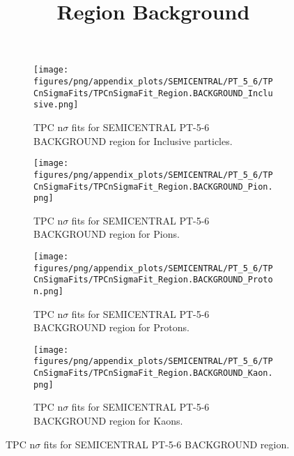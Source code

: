             \begin{figure}[H]
                \title{Region Background}
                \begin{subfigure}[b]{0.5\textwidth}
                    \centering
                    \texttt{[image: figures/png/appendix\_plots/SEMICENTRAL/PT\_5\_6/TPCnSigmaFits/TPCnSigmaFit\_Region.BACKGROUND\_Inclusive.png]}
                    \caption{TPC n$\sigma$ fits for SEMICENTRAL PT-5-6 BACKGROUND region for Inclusive particles.}
                    \label{fig:appendix_SEMICENTRAL_PT-5-6_BACKGROUND_Inclusive}
                \end{subfigure}
                \begin{subfigure}[b]{0.5\textwidth}
                    \centering
                    \texttt{[image: figures/png/appendix\_plots/SEMICENTRAL/PT\_5\_6/TPCnSigmaFits/TPCnSigmaFit\_Region.BACKGROUND\_Pion.png]}
                    \caption{TPC n$\sigma$ fits for SEMICENTRAL PT-5-6 BACKGROUND region for Pions.}
                    \label{fig:appendix_SEMICENTRAL_PT-5-6_BACKGROUND_Pion}
                \end{subfigure}
                \begin{subfigure}[b]{0.5\textwidth}
                    \centering
                    \texttt{[image: figures/png/appendix\_plots/SEMICENTRAL/PT\_5\_6/TPCnSigmaFits/TPCnSigmaFit\_Region.BACKGROUND\_Proton.png]}
                    \caption{TPC n$\sigma$ fits for SEMICENTRAL PT-5-6 BACKGROUND region for Protons.}
                    \label{fig:appendix_SEMICENTRAL_PT-5-6_BACKGROUND_Proton}
                \end{subfigure}
                \begin{subfigure}[b]{0.5\textwidth}
                    \centering
                    \texttt{[image: figures/png/appendix\_plots/SEMICENTRAL/PT\_5\_6/TPCnSigmaFits/TPCnSigmaFit\_Region.BACKGROUND\_Kaon.png]}
                    \caption{TPC n$\sigma$ fits for SEMICENTRAL PT-5-6 BACKGROUND region for Kaons.}
                    \label{fig:appendix_SEMICENTRAL_PT-5-6_BACKGROUND_Kaon}
                \end{subfigure}
                \caption{TPC n$\sigma$ fits for SEMICENTRAL PT-5-6 BACKGROUND region.}
                \label{fig:appendix_SEMICENTRAL_PT-5-6_BACKGROUND}
            \end{figure}
            \clearpage
            
    
